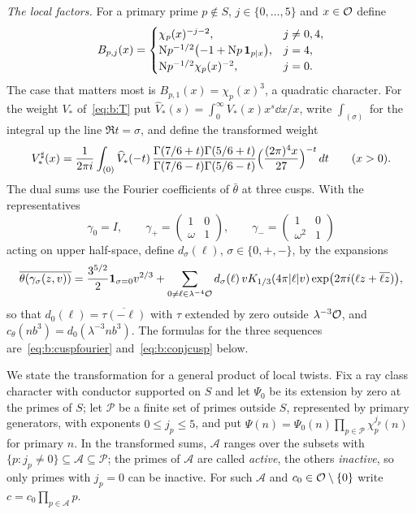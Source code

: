 \emph{The local factors.} For a primary prime $p\notin S$, $j\in\{0,\dots,5\}$ and $x\in\mathcal{O}$ define
\begin{equation}\label{eq:b:localfactors}
  B_{p,j}(x)=\begin{cases}\chi_p(x)^{-j-2},&j\ne0,4,\\ \mathrm{N} p^{-1/2}\bigl(-1+\mathrm{N} p\,\mathbf{1}_{p\mid x}\bigr),&j=4,\\ \mathrm{N} p^{-1/2}\chi_p(x)^{-2},&j=0.\end{cases}
\end{equation}
The case that matters most is $B_{p,1}(x)=\chi_p(x)^3$, a quadratic character. For the weight $V_*$ of~\eqref{eq:b:T} put $\widehat V_*(s)=\int_0^\infty V_*(x)x^s\dd x/x$, write $\int_{(\sigma)}$ for the integral up the line $\Re t=\sigma$, and define the transformed weight
\begin{equation}\label{eq:b:thetaweight}
  V_*^\sharp(x)=\frac1{2\pi i}\int_{(0)}\widehat V_*(-t)\,\frac{\Gamma(7/6+t)\Gamma(5/6+t)}{\Gamma(7/6-t)\Gamma(5/6-t)}\Bigl(\frac{(2\pi)^4x}{27}\Bigr)^{-t}\,d t\qquad(x>0).
\end{equation}
The dual sums use the Fourier coefficients of $\bar\theta$ at three cusps. With the representatives
\begin{equation}\label{eq:b:cusps}
  \gamma_0=I,\qquad\gamma_+=\begin{pmatrix}1&0\\\omega&1\end{pmatrix},\qquad\gamma_-=\begin{pmatrix}1&0\\\omega^2&1\end{pmatrix}
\end{equation}
acting on upper half-space, define $d_\sigma(\ell)$, $\sigma\in\{0,+,-\}$, by the expansions~\cite[(5.9), (5.15)]{DR}
\begin{equation}\label{eq:b:cuspcoeff}
  \overline{\theta(\gamma_\sigma(z,v))}=\frac{3^{5/2}}2\mathbf{1}_{\sigma=0}v^{2/3}+\sum_{0\ne\ell\in\lambda^{-4}\mathcal{O}}d_\sigma(\ell)\,vK_{1/3}(4\pi|\ell|v)\exp\bigl(2\pi i(\ell z+\overline{\ell z})\bigr),
\end{equation}
so that $d_0(\ell)=\overline{\tau(-\ell)}$ with $\tau$ extended by zero outside $\lambda^{-3}\mathcal{O}$, and $c_\theta(nb^3)=d_0(\lambda^{-3}nb^3)$. The formulas for the three sequences are~\eqref{eq:b:cuspfourier} and~\eqref{eq:b:conjcusp} below.

We state the transformation for a general product of local twists. Fix a ray class character with conductor supported on $S$ and let $\Psi_0$ be its extension by zero at the primes of $S$; let $\mathcal P$ be a finite set of primes outside $S$, represented by primary generators, with exponents $0\le j_p\le5$, and put $\Psi(n)=\Psi_0(n)\prod_{p\in\mathcal P}\chi_p^{j_p}(n)$ for primary $n$. In the transformed sums, $\mathcal A$ ranges over the subsets with $\{p:j_p\ne0\}\subseteq\mathcal A\subseteq\mathcal P$; the primes of $\mathcal A$ are called \emph{active}, the others \emph{inactive}, so only primes with $j_p=0$ can be inactive. For such $\mathcal A$ and $c_0\in\mathcal{O}\setminus\{0\}$ write $c=c_0\prod_{p\in\mathcal A}p$.

